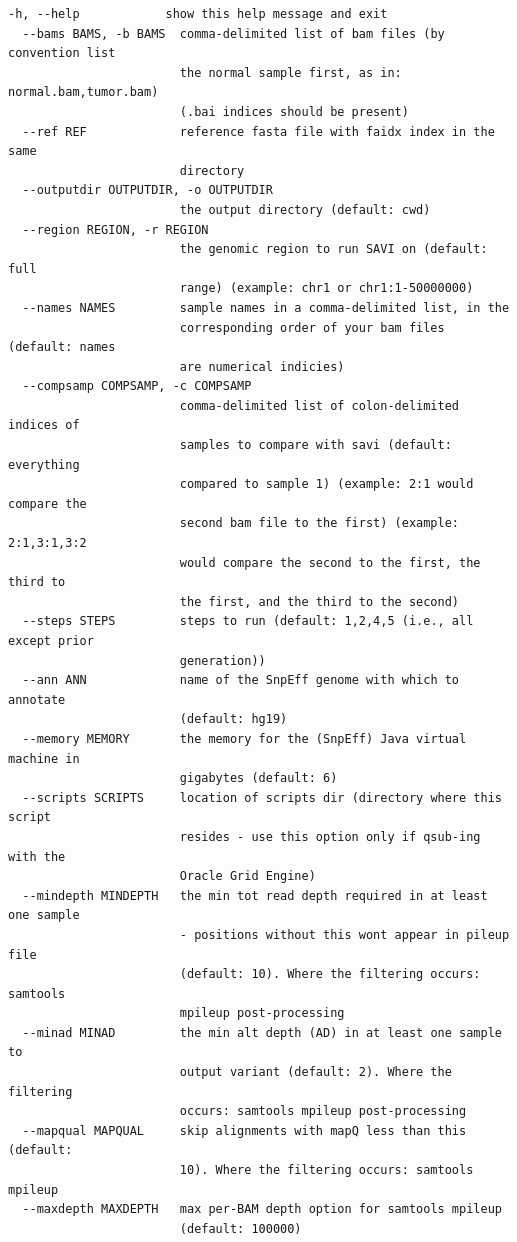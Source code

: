 \documentclass[letterpaper,14pt]{memoir}
\begin{document}
\begin{Verbatim}[fontsize=\small]
  -h, --help            show this help message and exit
  --bams BAMS, -b BAMS  comma-delimited list of bam files (by convention list
                        the normal sample first, as in: normal.bam,tumor.bam)
                        (.bai indices should be present)
  --ref REF             reference fasta file with faidx index in the same
                        directory
  --outputdir OUTPUTDIR, -o OUTPUTDIR
                        the output directory (default: cwd)
  --region REGION, -r REGION
                        the genomic region to run SAVI on (default: full
                        range) (example: chr1 or chr1:1-50000000)
  --names NAMES         sample names in a comma-delimited list, in the
                        corresponding order of your bam files (default: names
                        are numerical indicies)
  --compsamp COMPSAMP, -c COMPSAMP
                        comma-delimited list of colon-delimited indices of
                        samples to compare with savi (default: everything
                        compared to sample 1) (example: 2:1 would compare the
                        second bam file to the first) (example: 2:1,3:1,3:2
                        would compare the second to the first, the third to
                        the first, and the third to the second)
  --steps STEPS         steps to run (default: 1,2,4,5 (i.e., all except prior
                        generation))
  --ann ANN             name of the SnpEff genome with which to annotate
                        (default: hg19)
  --memory MEMORY       the memory for the (SnpEff) Java virtual machine in
                        gigabytes (default: 6)
  --scripts SCRIPTS     location of scripts dir (directory where this script
                        resides - use this option only if qsub-ing with the
                        Oracle Grid Engine)
  --mindepth MINDEPTH   the min tot read depth required in at least one sample
                        - positions without this wont appear in pileup file
                        (default: 10). Where the filtering occurs: samtools
                        mpileup post-processing
  --minad MINAD         the min alt depth (AD) in at least one sample to
                        output variant (default: 2). Where the filtering
                        occurs: samtools mpileup post-processing
  --mapqual MAPQUAL     skip alignments with mapQ less than this (default:
                        10). Where the filtering occurs: samtools mpileup
  --maxdepth MAXDEPTH   max per-BAM depth option for samtools mpileup
                        (default: 100000)

\end{Verbatim}
\end{document}
